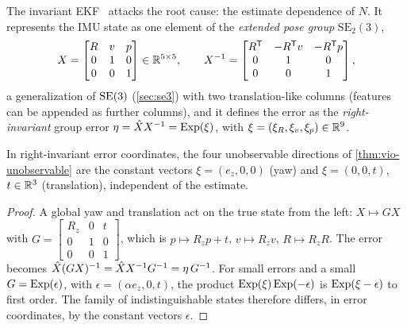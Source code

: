 The invariant EKF~\cite{barrau2017invariant} attacks the root cause: the estimate dependence of $N$. It represents the IMU state as one element
of the \emph{extended pose group} $\mathrm{SE}_2(3)$,
\begin{equation}
  X = \begin{bmatrix} R & v & p \\ 0 & 1 & 0 \\ 0 & 0 & 1 \end{bmatrix} \in \mathbb{R}^{5\times5}, \qquad
  X^{-1} = \begin{bmatrix} R^{\mathsf{T}} & -R^{\mathsf{T}} v & -R^{\mathsf{T}} p \\ 0 & 1 & 0 \\ 0 & 0 & 1 \end{bmatrix},
\end{equation}
a generalization of $\mathrm{SE}(3)$ (\cref{sec:se3}) with two translation-like columns (features can be appended as further columns), and it defines the
error as the \emph{right-invariant} group error $\eta = \hat XX^{-1} = \operatorname{Exp}(\xi)$, with $\xi = (\xi_R, \xi_v, \xi_p) \in \mathbb{R}^9$.

\begin{proposition}
\label{prop:invariant-nullspace}
In right-invariant error coordinates, the four unobservable directions of \cref{thm:vio-unobservable} are the constant vectors
$\xi = (e_z, 0, 0)$ (yaw) and $\xi = (0, 0, t)$, $t \in \mathbb{R}^3$ (translation), independent of the estimate.
\end{proposition}
\begin{proof}
A global yaw and translation act on the true state from the left: $X \mapsto GX$ with $G = \begin{bmatrix} R_z & 0 & t \\ 0 & 1 & 0 \\ 0 & 0 & 1\end{bmatrix}$, which is
$p \mapsto R_zp + t$, $v \mapsto R_zv$, $R \mapsto R_zR$. The error becomes $\hat X(GX)^{-1} = \hat XX^{-1} G^{-1} = \eta\,G^{-1}$. For small errors and a small
$G = \operatorname{Exp}(\epsilon)$, with $\epsilon = (\alpha e_z, 0, t)$, the product $\operatorname{Exp}(\xi)\operatorname{Exp}(-\epsilon)$ is $\operatorname{Exp}(\xi - \epsilon)$ to first order. The family of
indistinguishable states therefore differs, in error coordinates, by the constant vectors $\epsilon$.
\end{proof}

